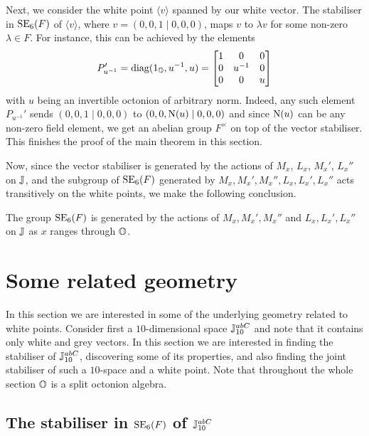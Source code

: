 Next, we consider the white point $\langle v \rangle$ spanned by our white vector. The stabiliser
in $\mathrm{SE}_6(F)$ of $\langle v \rangle$, where $v = (0,0,1\mid 0,0,0)$, maps 
$v$ to $\lambda v$ for some non-zero 
$\lambda \in F$. For instance, this can be achieved by the elements 
\begin{equation}
	\label{eq:puprime}
	P_{u^{-1}}' = \mathrm{diag}(1_{\mathbb{O}},u^{-1},u) = \begin{bmatrix}
		1 & 0 & 0 \\
		0 & u^{-1} & 0 \\
		0 & 0 & u
	\end{bmatrix}	 
\end{equation}
with 
$u$ being an invertible octonion of arbitrary norm. 
Indeed, any such element $P_{u^{-1}}'$ sends
$(0,0,1\mid 0,0,0)$ to $(0,0,\mathord{\mathrm{N}}(u)\mid 0,0,0)$ and since $\mathord{\mathrm{N}}(u)$ can be any non-zero 
field element, we get an abelian group $F^{\times}$ on top of the vector stabiliser. This finishes
the proof of the main theorem in this section. 

Now, since the vector stabiliser is generated by the actions of $M_x$, $L_x$, $M_x'$,
$L_x''$ on $\mathbb{J}$, and the subgroup of $\mathrm{SE}_6(F)$ generated by 
$M_x,M_x',M_x'',L_x,L_x',L_x''$ acts transitively on the white points, 
we make the following conclusion. 

\begin{theorem}
The group $\mathrm{SE}_6(F)$ is generated by the actions
of $M_x,M_x',M_x''$ and $L_x,L_x',L_x''$ on $\mathbb{J}$ as $x$ ranges through $\mathbb{O}$. 
\end{theorem}

\section{Some related geometry}
\label{section:1_geometry}

In this section we are interested in some of the underlying geometry related to white 
points. Consider first a $10$-dimensional
space $\mathbb{J}_{10}^{abC}$ and note that it 
contains only white and grey vectors. In this section we are interested in finding the 
stabiliser of $\mathbb{J}_{10}^{abC}$, discovering some of its properties, and also finding
the joint stabiliser of such a $10$-space and a white point. 
Note that throughout the whole section $\mathbb{O}$ is a split 
octonion algebra. 

\subsection{The stabiliser in $\mathrm{SE}_6(F)$ of $\mathbb{J}_{10}^{abC}$}


